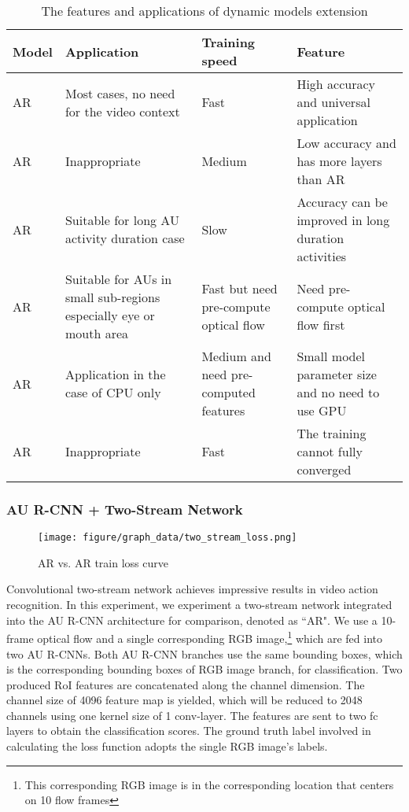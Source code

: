 \documentclass[5p,twocolumn]{elsarticle}
\begin{document}
\begin{table*}[t!]
	\scriptsize	
	\caption{The features and applications of dynamic models extension}
	\label{tab:dynamic_summary}
	\centering
	\tabcolsep=0.15cm
	
	\begin{tabular}{llll}
		\toprule
		Model & Application & Training speed & Feature  \\
		\midrule
		AR & Most cases, no need for the video context & Fast & High accuracy and universal application \\
		AR & Inappropriate &  Medium & Low accuracy and has more layers than AR  \\
		AR & Suitable for long AU activity duration case & Slow & Accuracy can be improved in long duration activities\\
		AR & Suitable for AUs in small sub-regions especially eye or mouth area & Fast but need pre-compute optical flow & Need pre-compute optical flow first \\
		AR & Application in the case of CPU only & Medium and need pre-computed features & Small model parameter size and no need to use GPU \\
		AR & Inappropriate & Fast & The training cannot fully converged \\
		\bottomrule
	\end{tabular}
\end{table*}

\subsubsection{AU R-CNN + Two-Stream Network}
\begin{figure}[htbp]
	\setlength{\abovecaptionskip}{0pt}
	\setlength{\belowcaptionskip}{-0pt}
	\begin{center}
		\texttt{[image: figure/graph\_data/two\_stream\_loss.png]}
	\end{center}
	\caption{AR vs. AR train loss curve}
	\label{fig:two_stream_loss}
	\vspace{-0.0cm}
\end{figure}

Convolutional two-stream network \cite{feichtenhofer2016convolutional} achieves impressive results in video action recognition. In this experiment, we experiment a two-stream network integrated into the AU R-CNN architecture for comparison, denoted as ``AR".
We use a 10-frame optical flow and a single corresponding RGB image,\footnote{This corresponding RGB image is in the corresponding location that centers on 10 flow frames} which are fed into two AU R-CNNs. Both AU R-CNN branches use the same bounding boxes, which is the corresponding bounding boxes of RGB image branch, for classification. Two produced  RoI features are concatenated along the channel dimension. The channel size of 4096 feature map is yielded, which will be reduced to 2048 channels using one kernel size of 1 conv-layer. The features are sent to two fc layers to obtain the classification scores. The ground truth label involved in calculating the loss function adopts the single RGB image's labels. 
\end{document}
